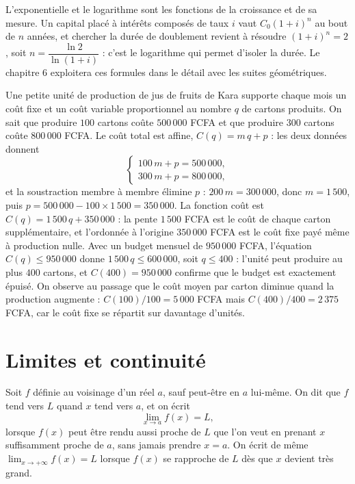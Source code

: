 \begin{remarque}
L'exponentielle et le logarithme sont les fonctions de la croissance et de sa mesure. Un capital placé à intérêts composés de taux $i$ vaut $C_{0}(1+i)^{n}$ au bout de $n$ années, et chercher la durée de doublement revient à résoudre $(1+i)^{n} = 2$, soit $n = \dfrac{\ln 2}{\ln(1+i)}$ : c'est le logarithme qui permet d'isoler la durée. Le chapitre 6 exploitera ces formules dans le détail avec les suites géométriques.
\end{remarque}

\begin{exemple}
Une petite unité de production de jus de fruits de Kara supporte chaque mois un coût fixe et un coût variable proportionnel au nombre $q$ de cartons produits. On sait que produire $100$ cartons coûte $500\,000$ FCFA et que produire $300$ cartons coûte $800\,000$ FCFA. Le coût total est affine, $C(q) = m\,q + p$ : les deux données donnent
\[
\begin{cases}
100\,m + p = 500\,000, \\
300\,m + p = 800\,000,
\end{cases}
\]
et la soustraction membre à membre élimine $p$ : $200\,m = 300\,000$, donc $m = 1\,500$, puis $p = 500\,000 - 100 \times 1\,500 = 350\,000$. La fonction coût est $C(q) = 1\,500\,q + 350\,000$ : la pente $1\,500$ FCFA est le coût de chaque carton supplémentaire, et l'ordonnée à l'origine $350\,000$ FCFA est le coût fixe payé même à production nulle. Avec un budget mensuel de $950\,000$ FCFA, l'équation $C(q) \leq 950\,000$ donne $1\,500\,q \leq 600\,000$, soit $q \leq 400$ : l'unité peut produire au plus $400$ cartons, et $C(400) = 950\,000$ confirme que le budget est exactement épuisé. On observe au passage que le coût moyen par carton diminue quand la production augmente : $C(100)/100 = 5\,000$ FCFA mais $C(400)/400 = 2\,375$ FCFA, car le coût fixe se répartit sur davantage d'unités.
\end{exemple}

\section{Limites et continuité}

\begin{definition}
Soit $f$ définie au voisinage d'un réel $a$, sauf peut-être en $a$ lui-même. On dit que $f$ tend vers $L$ quand $x$ tend vers $a$, et on écrit
\[
\lim_{x \to a} f(x) = L,
\]
lorsque $f(x)$ peut être rendu aussi proche de $L$ que l'on veut en prenant $x$ suffisamment proche de $a$, sans jamais prendre $x = a$. On écrit de même $\lim_{x \to +\infty} f(x) = L$ lorsque $f(x)$ se rapproche de $L$ dès que $x$ devient très grand.
\end{definition}

